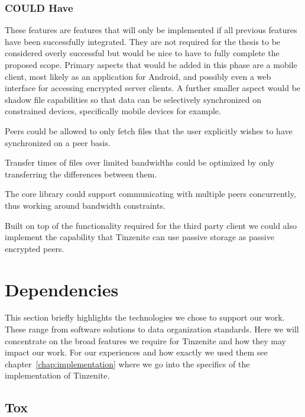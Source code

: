 \subsubsection{COULD Have}
\label{subs:COULD Have}

These features are features that will only be implemented if all previous features have been successfully integrated.
They are not required for the thesis to be considered overly successful but would be nice to have to fully complete the proposed scope.
Primary aspects that would be added in this phase are a mobile client, most likely as an application for Android, and possibly even a web interface for accessing encrypted server clients.
A further smaller aspect would be shadow file capabilities so that data can be selectively synchronized on constrained devices, specifically mobile devices for example.

\begin{description}[leftmargin=7.5em,style=nextline,noitemsep,nolistsep]
\item[Shadow Files]
    Peers could be allowed to only fetch files that the user explicitly wishes to have synchronized on a peer basis.
\item[Delta Updates]
    Transfer times of files over limited bandwidths could be optimized by only transferring the differences between them.
\item[Concurrency]
    The core library could support communicating with multiple peers concurrently, thus working around bandwidth constraints.
\item[Passive Peer]
    Built on top of the functionality required for the third party client we could also implement the capability that Tinzenite can use passive storage as passive encrypted peers.
\end{description}

\section{Dependencies}
\label{sec:Dependencies}

This section briefly highlights the technologies we chose to support our work.
These range from software solutions to data organization standards.
Here we will concentrate on the broad features we require for Tinzenite and how they may impact our work.
For our experiences and how exactly we used them see chapter~\ref{chap:implementation} where we go into the specifics of the implementation of Tinzenite.

\subsection{Tox}

